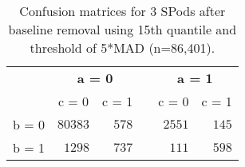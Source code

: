\begin{table}[!tbp]
\begin{center}
\begin{tabular}{lrrcrr}
\hline\hline
\multicolumn{1}{l}{\bfseries }&\multicolumn{2}{c}{\bfseries a = 0}&\multicolumn{1}{c}{\bfseries }&\multicolumn{2}{c}{\bfseries a = 1}\tabularnewline
\cline{2-3} \cline{5-6}
\multicolumn{1}{l}{}&\multicolumn{1}{c}{c = 0}&\multicolumn{1}{c}{c = 1}&\multicolumn{1}{c}{}&\multicolumn{1}{c}{c = 0}&\multicolumn{1}{c}{c = 1}\tabularnewline
\hline
b = 0&$80383$&$578$&&$2551$&$145$\tabularnewline
b = 1&$ 1298$&$737$&&$ 111$&$598$\tabularnewline
\hline
\end{tabular}\end{center}
\caption{Confusion matrices for 3 SPods after baseline 
      removal using 15th quantile and threshold of 5*MAD (n=86,401).\label{tab:conf}} 
\end{table}
